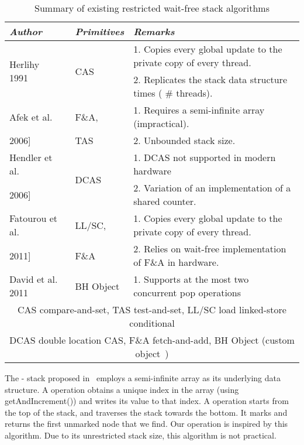 \documentclass{llncs}
\begin{document}
\begin{table*}[!htb]
\scriptsize
\begin{center}

\begin{tabular}{|l|l|l| }
\hline
                                                         
{\em Author}			&{\em Primitives}	&{\em Remarks}\\\hline 

  
\hline  
\multirow{2}{*}{Herlihy 1991~\cite{oldUniversal}}		&\multirow{2}{*}{CAS}	&1. Copies every global update to the
private copy of every thread.
\\
	&							&2. Replicates the stack data structure  times ( \# threads).
\\\hline

Afek et al.~\cite{arrayBased}  	&F\&A,	 		&1. Requires a semi-infinite array (impractical).
\\  
2006]				&TAS			&2. Unbounded stack size.
\\\hline 

Hendler et al.~\cite{WaitFreeSharedCounter1}	&\multirow{2}{*}{DCAS}	&1. DCAS not supported in modern hardware 
\\  
2006]						&			& 2. Variation of an implementation of a shared counter. 
\\\hline 


Fatourou et al.~\cite{newUniversal}	&LL/SC,	&1. Copies every global update to the private copy of every thread. \\
2011]			&F\&A	&2. Relies on wait-free implementation of F\&A in hardware.
\\\hline 
David et al. 2011 ~\cite{restrictedStack}		&BH Object		&1. Supports at the most two concurrent pop operations
\\\hline      
\hline
\multicolumn{3}{||c||}{CAS  compare-and-set, TAS  test-and-set, LL/SC 
load linked-store conditional} \\
\multicolumn{3}{||c||}{DCAS  double location CAS, F\&A  fetch-and-add, BH Object (custom
object~\cite{restrictedStack})} \\
\hline
\end{tabular}
\caption{ Summary of existing restricted wait-free stack algorithms  \label{tab:rel}}
\end{center}

\vskip -3mm
\end{table*}

The - stack proposed in~\cite{arrayBased} employs a semi-infinite
array as its underlying data structure. A  operation obtains a unique index in the
array (using getAndIncrement()) and writes its value to that index. A 
operation starts from the top of the stack, and traverses the stack towards the bottom.
It marks and returns the first unmarked node that we find. Our  operation
is inspired by this algorithm. Due to its unrestricted stack size, this algorithm
is not practical.
\end{document}
